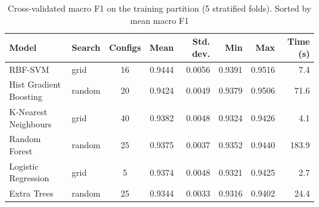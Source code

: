 \begin{table}[htbp]
\centering
\footnotesize
\caption{Cross-validated macro F1 on the training partition (5 stratified folds). Sorted by mean macro F1}
\label{tab:cv_results}
\begin{tabular}{llcrrrrr}
\toprule
Model & Search & Configs & Mean & Std. dev. & Min & Max & Time (s) \\
\midrule
RBF-SVM & grid & 16 & 0.9444 & 0.0056 & 0.9391 & 0.9516 & 7.4 \\
Hist Gradient Boosting & random & 20 & 0.9424 & 0.0049 & 0.9379 & 0.9506 & 71.6 \\
K-Nearest Neighbours & grid & 40 & 0.9382 & 0.0048 & 0.9324 & 0.9426 & 4.1 \\
Random Forest & random & 25 & 0.9375 & 0.0037 & 0.9352 & 0.9440 & 183.9 \\
Logistic Regression & grid & 5 & 0.9374 & 0.0048 & 0.9321 & 0.9425 & 2.7 \\
Extra Trees & random & 25 & 0.9344 & 0.0033 & 0.9316 & 0.9402 & 24.4 \\
\bottomrule
\end{tabular}
\end{table}
